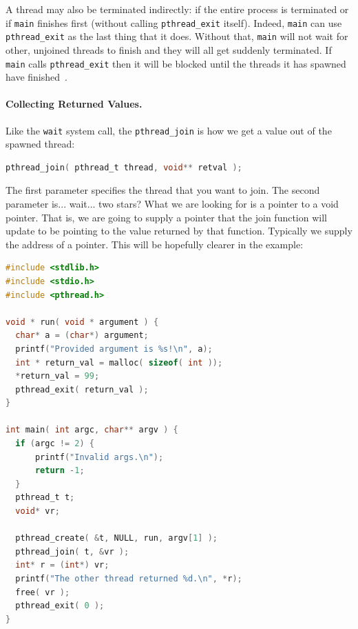 A thread may also be terminated indirectly: if the entire process is terminated or if \texttt{main} finishes first (without calling \texttt{pthread\_exit} itself). Indeed, \texttt{main} can use \texttt{pthread\_exit} as the last thing that it does. Without that, \texttt{main} will not wait for other, unjoined threads to finish and they will all get suddenly terminated. If \texttt{main} calls \texttt{pthread\_exit} then it will be blocked until the threads it has spawned have finished~\cite{pthreads}.

\paragraph{Collecting Returned Values.} Like the \texttt{wait} system call, the \texttt{pthread\_join} is how we get a value out of the spawned thread:

\begin{lstlisting}[language=C]
pthread_join( pthread_t thread, void** retval );
\end{lstlisting}

The first parameter specifies the thread that you want to join. The second parameter is... wait... two stars? What we are looking for is a pointer to a void pointer. That is, we are going to supply a pointer that the join function will update to be pointing to the value returned by that function. Typically we supply the address of a pointer. This will be hopefully clearer in the example:

\begin{lstlisting}[language=C]
#include <stdlib.h>
#include <stdio.h>
#include <pthread.h>

void * run( void * argument ) { 
  char* a = (char*) argument;
  printf("Provided argument is %s!\n", a); 
  int * return_val = malloc( sizeof( int )); 
  *return_val = 99; 
  pthread_exit( return_val );
}

int main( int argc, char** argv ) { 
  if (argc != 2) {
      printf("Invalid args.\n");
      return -1; 
  }
  pthread_t t;
  void* vr; 
  
  pthread_create( &t, NULL, run, argv[1] );
  pthread_join( t, &vr );
  int* r = (int*) vr; 
  printf("The other thread returned %d.\n", *r);
  free( vr );
  pthread_exit( 0 );
}
\end{lstlisting}



